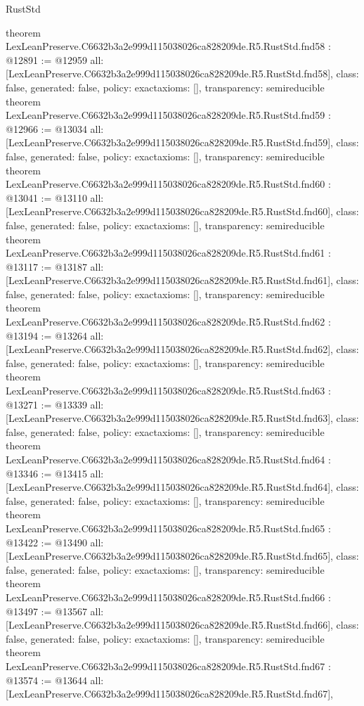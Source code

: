\begin{lexlean}{RustStd}
\begin{coremodule}
{}
theorem LexLeanPreserve.C6632b3a2e999d115038026ca828209de.R5.RustStd.fnd58 : @12891 := @12959 {
  all: [LexLeanPreserve.C6632b3a2e999d115038026ca828209de.R5.RustStd.fnd58],
  class: false,
  generated: false,
  policy: exact{axioms: []},
  transparency: semireducible
}
theorem LexLeanPreserve.C6632b3a2e999d115038026ca828209de.R5.RustStd.fnd59 : @12966 := @13034 {
  all: [LexLeanPreserve.C6632b3a2e999d115038026ca828209de.R5.RustStd.fnd59],
  class: false,
  generated: false,
  policy: exact{axioms: []},
  transparency: semireducible
}
theorem LexLeanPreserve.C6632b3a2e999d115038026ca828209de.R5.RustStd.fnd60 : @13041 := @13110 {
  all: [LexLeanPreserve.C6632b3a2e999d115038026ca828209de.R5.RustStd.fnd60],
  class: false,
  generated: false,
  policy: exact{axioms: []},
  transparency: semireducible
}
theorem LexLeanPreserve.C6632b3a2e999d115038026ca828209de.R5.RustStd.fnd61 : @13117 := @13187 {
  all: [LexLeanPreserve.C6632b3a2e999d115038026ca828209de.R5.RustStd.fnd61],
  class: false,
  generated: false,
  policy: exact{axioms: []},
  transparency: semireducible
}
theorem LexLeanPreserve.C6632b3a2e999d115038026ca828209de.R5.RustStd.fnd62 : @13194 := @13264 {
  all: [LexLeanPreserve.C6632b3a2e999d115038026ca828209de.R5.RustStd.fnd62],
  class: false,
  generated: false,
  policy: exact{axioms: []},
  transparency: semireducible
}
theorem LexLeanPreserve.C6632b3a2e999d115038026ca828209de.R5.RustStd.fnd63 : @13271 := @13339 {
  all: [LexLeanPreserve.C6632b3a2e999d115038026ca828209de.R5.RustStd.fnd63],
  class: false,
  generated: false,
  policy: exact{axioms: []},
  transparency: semireducible
}
theorem LexLeanPreserve.C6632b3a2e999d115038026ca828209de.R5.RustStd.fnd64 : @13346 := @13415 {
  all: [LexLeanPreserve.C6632b3a2e999d115038026ca828209de.R5.RustStd.fnd64],
  class: false,
  generated: false,
  policy: exact{axioms: []},
  transparency: semireducible
}
theorem LexLeanPreserve.C6632b3a2e999d115038026ca828209de.R5.RustStd.fnd65 : @13422 := @13490 {
  all: [LexLeanPreserve.C6632b3a2e999d115038026ca828209de.R5.RustStd.fnd65],
  class: false,
  generated: false,
  policy: exact{axioms: []},
  transparency: semireducible
}
theorem LexLeanPreserve.C6632b3a2e999d115038026ca828209de.R5.RustStd.fnd66 : @13497 := @13567 {
  all: [LexLeanPreserve.C6632b3a2e999d115038026ca828209de.R5.RustStd.fnd66],
  class: false,
  generated: false,
  policy: exact{axioms: []},
  transparency: semireducible
}
theorem LexLeanPreserve.C6632b3a2e999d115038026ca828209de.R5.RustStd.fnd67 : @13574 := @13644 {
  all: [LexLeanPreserve.C6632b3a2e999d115038026ca828209de.R5.RustStd.fnd67],
}
\end{coremodule}
\end{lexlean}
